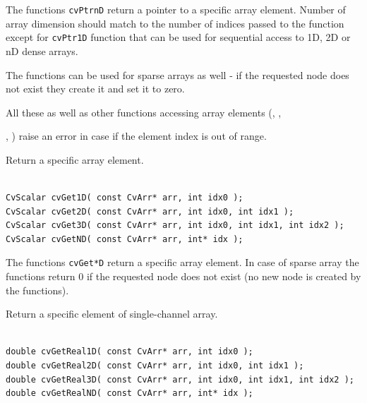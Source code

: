 The functions \texttt{cvPtrnD} return a pointer to a specific array element. Number of array dimension should match to the number of indices passed to the function except for \texttt{cvPtr1D} function that can be used for sequential access to 1D, 2D or nD dense arrays.

The functions can be used for sparse arrays as well - if the requested node does not exist they create it and set it to zero.

All these as well as other functions accessing array elements (, , 

, ) raise an error in case if the element index is out of range.

\label{Get*D}

Return a specific array element.

\begin{lstlisting}

CvScalar cvGet1D( const CvArr* arr, int idx0 );
CvScalar cvGet2D( const CvArr* arr, int idx0, int idx1 );
CvScalar cvGet3D( const CvArr* arr, int idx0, int idx1, int idx2 );
CvScalar cvGetND( const CvArr* arr, int* idx );

\end{lstlisting}

\begin{description}
\end{description}


The functions \texttt{cvGet*D} return a specific array element. In case of sparse array the functions return 0 if the requested node does not exist (no new node is created by the functions).

\label{GetReal*D}

Return a specific element of single-channel array.

\begin{lstlisting}

double cvGetReal1D( const CvArr* arr, int idx0 );
double cvGetReal2D( const CvArr* arr, int idx0, int idx1 );
double cvGetReal3D( const CvArr* arr, int idx0, int idx1, int idx2 );
double cvGetRealND( const CvArr* arr, int* idx );

\end{lstlisting}

